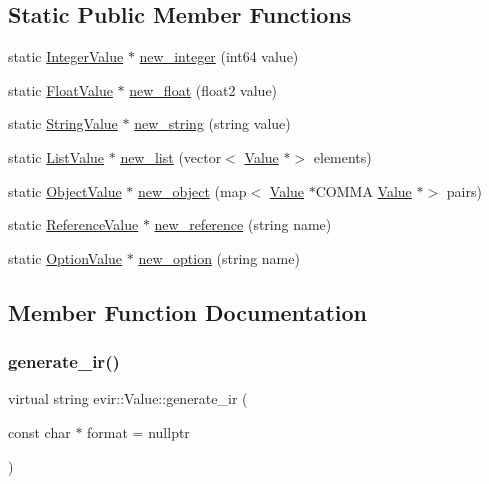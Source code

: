 \subsection*{Static Public Member Functions}
\begin{DoxyCompactItemize}
\item 
static \hyperlink{classevir_1_1IntegerValue}{Integer\+Value} $\ast$ \hyperlink{classevir_1_1Value_a086f7932417f5b1fa47f627c175d1c65}{new\+\_\+integer} (int64 value)
\item 
static \hyperlink{classevir_1_1FloatValue}{Float\+Value} $\ast$ \hyperlink{classevir_1_1Value_a90a29b6a33606b8ada904688ce0a302f}{new\+\_\+float} (float2 value)
\item 
static \hyperlink{classevir_1_1StringValue}{String\+Value} $\ast$ \hyperlink{classevir_1_1Value_a56a75d435ff168c8d3f104018f9b58a5}{new\+\_\+string} (string value)
\item 
static \hyperlink{classevir_1_1ListValue}{List\+Value} $\ast$ \hyperlink{classevir_1_1Value_a0936d4b3ac1b972fc784dc6b71ca0ca2}{new\+\_\+list} (vector$<$ \hyperlink{classevir_1_1Value}{Value} $\ast$$>$ elements)
\item 
static \hyperlink{classevir_1_1ObjectValue}{Object\+Value} $\ast$ \hyperlink{classevir_1_1Value_a4afc4919cf8f686d97a8f59ea7719ac1}{new\+\_\+object} (map$<$ \hyperlink{classevir_1_1Value}{Value} $\ast$C\+O\+M\+MA \hyperlink{classevir_1_1Value}{Value} $\ast$$>$ pairs)
\item 
static \hyperlink{classevir_1_1ReferenceValue}{Reference\+Value} $\ast$ \hyperlink{classevir_1_1Value_a550b2d56a46a357282ad167821fedbe5}{new\+\_\+reference} (string name)
\item 
static \hyperlink{classevir_1_1OptionValue}{Option\+Value} $\ast$ \hyperlink{classevir_1_1Value_af0e8e17cc7ab9c0907ba4c8994ef169a}{new\+\_\+option} (string name)
\end{DoxyCompactItemize}


\subsection{Member Function Documentation}
\mbox{\label{classevir_1_1Value_a3e7e5bc634fd5bba528324076fe2a763}} 
\subsubsection{\texorpdfstring{generate\+\_\+ir()}{generate\_ir()}}
{\footnotesize\ttfamily virtual string evir\+::\+Value\+::generate\+\_\+ir (\begin{DoxyParamCaption}\item[{const char $\ast$}]{format = {\ttfamily nullptr} }\end{DoxyParamCaption})\hspace{0.3cm}{\ttfamily [pure virtual]}}


